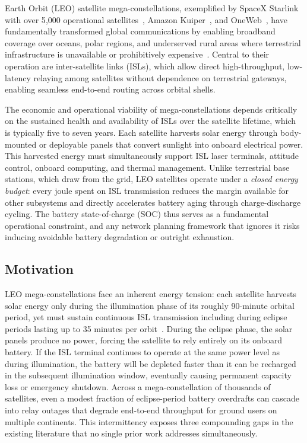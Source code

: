 \documentclass[journal]{IEEEtran}
\begin{document}
 Earth Orbit (LEO) satellite
mega-constellations, exemplified by SpaceX Starlink with over 5{,}000 operational satellites~\cite{cen2024satflow}, Amazon Kuiper~\cite{cen2024satflow}, and OneWeb~\cite{cen2024satflow}, have fundamentally transformed global communications by enabling broadband coverage over oceans, polar regions, and underserved rural areas where terrestrial infrastructure is unavailable or prohibitively expensive~\cite{kodheli2020survey}. Central to their operation are inter-satellite links (ISLs), which allow direct high-throughput, low-latency relaying among satellites without dependence on terrestrial gateways, enabling seamless end-to-end routing across orbital shells.

The economic and operational viability of mega-constellations depends critically on the sustained health and availability of ISLs over the satellite lifetime, which is typically five to seven years. Each satellite harvests solar energy through body-mounted or deployable panels that convert sunlight into onboard electrical power. This harvested energy must simultaneously support ISL laser terminals, attitude control, onboard computing, and thermal management. Unlike terrestrial base stations, which draw from the grid, LEO satellites operate under a \emph{closed energy budget}: every joule spent on ISL transmission reduces the margin available for other subsystems and directly accelerates battery aging through charge-discharge cycling. The battery state-of-charge (SOC) thus serves as a fundamental operational constraint, and any network planning framework that ignores it risks inducing avoidable battery degradation or outright exhaustion.

\subsection{Motivation}
LEO mega-constellations face an inherent energy tension: each satellite harvests solar energy only during the illumination phase of its roughly 90-minute orbital period, yet must sustain continuous ISL transmission including during eclipse periods lasting up to 35 minutes per orbit~\cite{kodheli2020survey}. During the eclipse phase, the solar panels produce no power, forcing the satellite to rely entirely on its onboard battery. If the ISL terminal continues to operate at the same power level as during illumination, the battery will be depleted faster than it can be recharged in the subsequent illumination window, eventually causing permanent capacity loss or emergency shutdown. Across a mega-constellation of thousands of satellites, even a modest fraction of eclipse-period battery overdrafts can cascade into relay outages that degrade end-to-end throughput for ground users on multiple continents. This intermittency exposes three compounding gaps in the existing literature that no single prior work addresses simultaneously.
\end{document}
